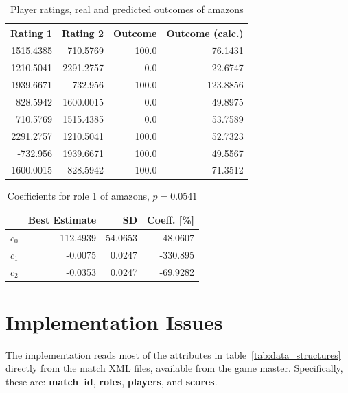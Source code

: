 \documentclass[a4paper,10pt]{article}
\begin{document}
\begin{table}[htp]
	\begin{center}
		\begin{tabular}{rrrr}
			\hline
			\textbf{Rating 1} & \textbf{Rating 2} & \textbf{Outcome} & \textbf{Outcome (calc.)} \\ 
			\hline
				1515.4385    &	710.5769     &	100.0        &	76.1431  \\
				1210.5041    &	2291.2757    &	0.0          &	22.6747  \\
				1939.6671    &	-732.956     &	100.0        &	123.8856 \\
				828.5942     &	1600.0015    &	0.0          &	49.8975  \\
				710.5769     &	1515.4385    &	0.0          &	53.7589  \\
				2291.2757    &	1210.5041    &	100.0        &	52.7323  \\
				-732.956     &	1939.6671    &	100.0        &	49.5567  \\
				1600.0015    &	828.5942     &	100.0        &	71.3512  \\
			\hline
		\end{tabular}
	\end{center}
	\caption{Player ratings, real and predicted outcomes of amazons}
	\label{tab:outcomes_amazons}
\end{table}

\begin{table}[htp]
	\begin{center}
		\begin{tabular}{rrrr}
			\hline
			& \textbf{Best Estimate} & \textbf{SD} & \textbf{Coeff. [\%]} \\ 
			\hline
			$c_0$   &	112.4939     &	54.0653      &	48.0607  \\
			$c_1$   &	-0.0075      &	0.0247       &	-330.895 \\
			$c_2$   &	-0.0353      &	0.0247       &	-69.9282 \\
			\hline
		\end{tabular}
	\end{center}
	\caption{Coefficients for role 1 of amazons, $p = 0.0541$}
	\label{tab:coefficients_amazons}
\end{table}


\section{Implementation Issues}

The implementation reads most of the attributes in table~\ref{tab:data_structures} directly from the match XML files, available from the game master. Specifically, these are:
\textbf{match~id}, \textbf{roles}, \textbf{players}, and \textbf{scores}.
\end{document}
